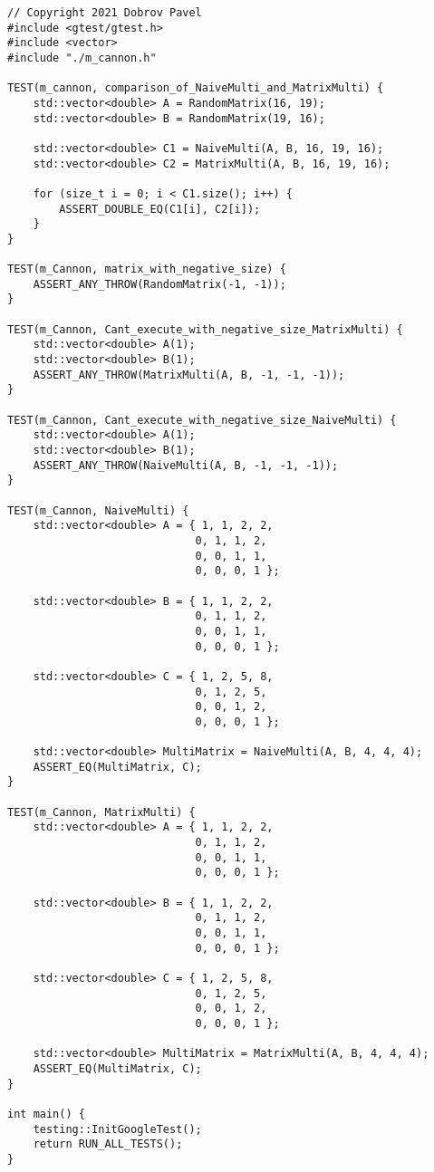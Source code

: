 \documentclass{report}
\begin{document}
\begin{lstlisting}
// Copyright 2021 Dobrov Pavel
#include <gtest/gtest.h>
#include <vector>
#include "./m_cannon.h"

TEST(m_cannon, comparison_of_NaiveMulti_and_MatrixMulti) {
    std::vector<double> A = RandomMatrix(16, 19);
    std::vector<double> B = RandomMatrix(19, 16);

    std::vector<double> C1 = NaiveMulti(A, B, 16, 19, 16);
    std::vector<double> C2 = MatrixMulti(A, B, 16, 19, 16);

    for (size_t i = 0; i < C1.size(); i++) {
        ASSERT_DOUBLE_EQ(C1[i], C2[i]);
    }
}

TEST(m_Cannon, matrix_with_negative_size) {
    ASSERT_ANY_THROW(RandomMatrix(-1, -1));
}

TEST(m_Cannon, Cant_execute_with_negative_size_MatrixMulti) {
    std::vector<double> A(1);
    std::vector<double> B(1);
    ASSERT_ANY_THROW(MatrixMulti(A, B, -1, -1, -1));
}

TEST(m_Cannon, Cant_execute_with_negative_size_NaiveMulti) {
    std::vector<double> A(1);
    std::vector<double> B(1);
    ASSERT_ANY_THROW(NaiveMulti(A, B, -1, -1, -1));
}

TEST(m_Cannon, NaiveMulti) {
    std::vector<double> A = { 1, 1, 2, 2,
                             0, 1, 1, 2,
                             0, 0, 1, 1,
                             0, 0, 0, 1 };

    std::vector<double> B = { 1, 1, 2, 2,
                             0, 1, 1, 2,
                             0, 0, 1, 1,
                             0, 0, 0, 1 };

    std::vector<double> C = { 1, 2, 5, 8,
                             0, 1, 2, 5,
                             0, 0, 1, 2,
                             0, 0, 0, 1 };

    std::vector<double> MultiMatrix = NaiveMulti(A, B, 4, 4, 4);
    ASSERT_EQ(MultiMatrix, C);
}

TEST(m_Cannon, MatrixMulti) {
    std::vector<double> A = { 1, 1, 2, 2,
                             0, 1, 1, 2,
                             0, 0, 1, 1,
                             0, 0, 0, 1 };

    std::vector<double> B = { 1, 1, 2, 2,
                             0, 1, 1, 2,
                             0, 0, 1, 1,
                             0, 0, 0, 1 };

    std::vector<double> C = { 1, 2, 5, 8,
                             0, 1, 2, 5,
                             0, 0, 1, 2,
                             0, 0, 0, 1 };

    std::vector<double> MultiMatrix = MatrixMulti(A, B, 4, 4, 4);
    ASSERT_EQ(MultiMatrix, C);
}

int main() {
    testing::InitGoogleTest();
    return RUN_ALL_TESTS();
}
\end{lstlisting}
\end{document}
